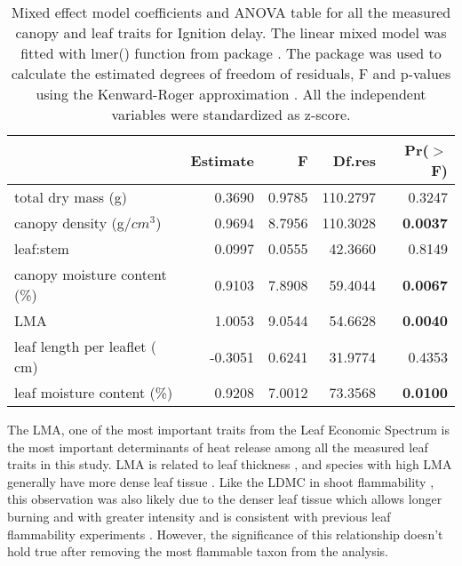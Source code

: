 \documentclass[12pt]{report}
\begin{document}
\begin{table}[ht]
\centering
\caption{Mixed effect model coefficients and ANOVA table for all the measured canopy and leaf traits for Ignition delay. The linear mixed model was fitted with lmer() function from  package \citep{bates2009package}. The  package \citep{fox2013hypothesis} was used to calculate the estimated degrees of freedom of residuals, F and p-values using the Kenward-Roger approximation \citep{kenward1997small}. All the independent variables were standardized  as z-score.}
\vspace{0.2 cm}
\begin{tabular}{lrrrr}
  \hline
 & Estimate & F & Df.res & Pr($>$F) \\ 
  \hline 
  total dry mass (g) & 0.3690  & 0.9785  & 110.2797 & 0.3247 \\ 
  canopy density (g/{$cm^3$}) & 0.9694 & 8.7956  & 110.3028 & \textbf{0.0037} \\ 
  leaf:stem & 0.0997 & 0.0555  & 42.3660 & 0.8149 \\ 
  canopy moisture content (\%) & 0.9103 & 7.8908 & 59.4044 & \textbf{0.0067} \\ 
  LMA & 1.0053 & 9.0544  & 54.6628 & \textbf{0.0040} \\ 
  leaf length per leaflet (\,cm) & -0.3051 & 0.6241 & 31.9774 & 0.4353 \\ 
  leaf moisture content (\%) & 0.9208 & 7.0012  & 73.3568 & \textbf{0.0100} \\ 
  \hline
\end{tabular}
\end{table}





The \uppercase{lma}, one of the most important traits from the Leaf Economic Spectrum \citep{wright2004worldwide} is the most important determinants of heat release among all the measured leaf traits in this study. \uppercase{lma} is related to leaf thickness \citep{niinemets1999research}, and species with high \uppercase{lma} generally have more dense leaf tissue \citep{poorter2009causes}. Like the \uppercase{ldmc} in shoot flammability \citep{alam2020shoot,potts2022growth}, this observation was also likely due to the denser leaf tissue which allows longer burning and with greater intensity and is consistent with previous leaf flammability experiments \citep{krix2018landscape}. However, the significance of this relationship doesn’t hold true after removing the most flammable taxon from the analysis. 
\end{document}
